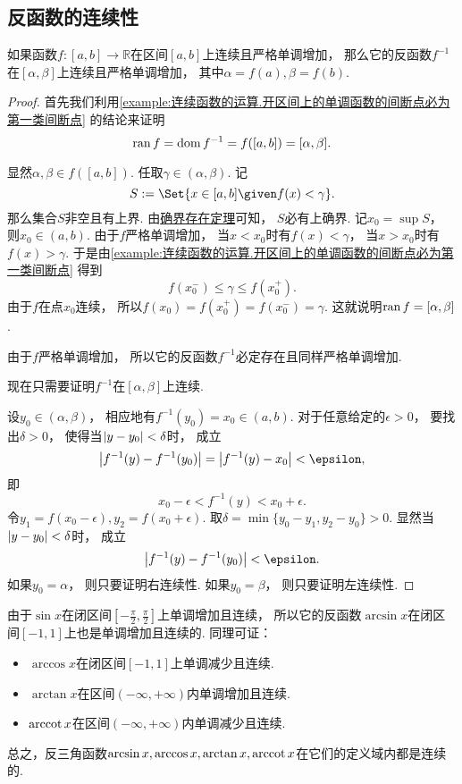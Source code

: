 \subsection{反函数的连续性}
\begin{theorem}\label{theorem:极限.连续函数的极限2}
如果函数\(f\colon[a,b]\to\mathbb{R}\)在区间\([a,b]\)上连续且严格单调增加，
那么它的反函数\(f^{-1}\)在\([\alpha,\beta]\)上连续且严格单调增加，
其中\(\alpha=f(a),\beta=f(b)\).
\begin{proof}
首先我们利用\cref{example:连续函数的运算.开区间上的单调函数的间断点必为第一类间断点} 的结论来证明\[
	\operatorname{ran} f
	= \operatorname{dom} f^{-1}
	= f([a,b])
	= [\alpha,\beta].
\]

显然\(\alpha,\beta \in f([a,b])\).
任取\(\gamma\in(\alpha,\beta)\).
记\[
	S \defeq \Set{ x\in[a,b] \given f(x)<\gamma }.
\]
那么集合\(S\)非空且有上界.
由\hyperref[theorem:实数.确界原理]{确界存在定理}可知，
\(S\)必有上确界.
记\(x_0 = \sup S\)，
则\(x_0\in(a,b)\).
由于\(f\)严格单调增加，
当\(x<x_0\)时有\(f(x)<\gamma\)，
当\(x>x_0\)时有\(f(x)>\gamma\).
于是由\cref{example:连续函数的运算.开区间上的单调函数的间断点必为第一类间断点} 得到\[
	f(x_0^-) \leq \gamma \leq f(x_0^+).
\]
由于\(f\)在点\(x_0\)连续，
所以\(f(x_0)
= f(x_0^+)
= f(x_0^-)
= \gamma\).
这就说明\(\operatorname{ran} f = [\alpha,\beta]\).

由于\(f\)严格单调增加，
所以它的反函数\(f^{-1}\)必定存在且同样严格单调增加.

现在只需要证明\(f^{-1}\)在\([\alpha,\beta]\)上连续.

设\(y_0\in(\alpha,\beta)\)，
相应地有\(f^{-1}(y_0)=x_0\in(a,b)\).
对于任意给定的\(\epsilon>0\)，
要找出\(\delta>0\)，
使得当\(\abs{y-y_0}<\delta\)时，
成立\[
	\abs{f^{-1}(y) - f^{-1}(y_0)}
	= \abs{f^{-1}(y) - x_0}
	< \epsilon,
\]
即\[
	x_0 - \epsilon < f^{-1}(y) < x_0 + \epsilon.
\]
令\(y_1 = f(x_0 - \epsilon),
y_2 = f(x_0 + \epsilon)\).
取\(\delta = \min\{y_0 - y_1, y_2 - y_0\} > 0\).
显然当\(\abs{y - y_0} < \delta\)时，
成立\[
	\abs{f^{-1}(y) - f^{-1}(y_0)} < \epsilon.
\]
如果\(y_0 = \alpha\)，
则只要证明右连续性.
如果\(y_0 = \beta\)，
则只要证明左连续性.
\end{proof}
\end{theorem}

\begin{example}
由于\(\sin x\)在闭区间\(\left[-\frac{\pi}{2},\frac{\pi}{2}\right]\)上单调增加且连续，
所以它的反函数\(\arcsin x\)在闭区间\([-1,1]\)上也是单调增加且连续的.
同理可证：
\begin{itemize}
	\item \(\arccos x\)在闭区间\([-1,1]\)上单调减少且连续.
	\item \(\arctan x\)在区间\((-\infty,+\infty)\)内单调增加且连续.
	\item \(\arccot x\)在区间\((-\infty,+\infty)\)内单调减少且连续.
\end{itemize}
总之，反三角函数\(\arcsin x,\arccos x,\arctan x,\arccot x\)在它们的定义域内都是连续的.
\end{example}

